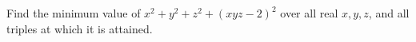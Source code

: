 Find the minimum value of $x^2+y^2+z^2+(xyz-2)^2$ over all real $x,y,z$, and all triples at which it is attained.
